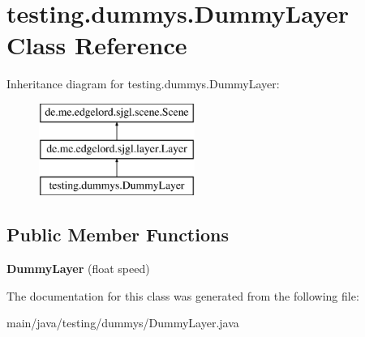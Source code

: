 \hypertarget{classtesting_1_1dummys_1_1_dummy_layer}{}\section{testing.\+dummys.\+Dummy\+Layer Class Reference}
\label{classtesting_1_1dummys_1_1_dummy_layer}
Inheritance diagram for testing.\+dummys.\+Dummy\+Layer\+:\begin{figure}[H]
\begin{center}
\leavevmode
\includegraphics[height=3.000000cm]{classtesting_1_1dummys_1_1_dummy_layer}
\end{center}
\end{figure}
\subsection*{Public Member Functions}
\begin{DoxyCompactItemize}
\item 
\mbox{\label{classtesting_1_1dummys_1_1_dummy_layer_aca364729198e6506c1a827a6c7501d16}} 
{\bfseries Dummy\+Layer} (float speed)
\end{DoxyCompactItemize}


The documentation for this class was generated from the following file\+:\begin{DoxyCompactItemize}
\item 
main/java/testing/dummys/Dummy\+Layer.\+java\end{DoxyCompactItemize}
